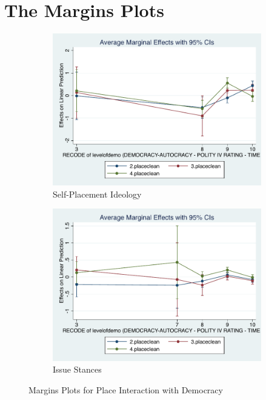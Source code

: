 \documentclass[12pt, titlepage]{article}
\begin{document}
\section{The Margins Plots}

\begin{figure}[H]
	\centering
	\begin{subfigure}[b]{0.475\textwidth}   
		\centering 
		\includegraphics[width=\textwidth]{Margins/IdeoPlaceDem}
		\caption{Self-Placement Ideology}
	\end{subfigure}
	\hfill
	\begin{subfigure}[b]{0.475\textwidth}
		\centering 
		\includegraphics[width=\textwidth]{Margins/LibPlaceDem}
		\caption{Issue Stances}
	\end{subfigure}
	\caption{Margins Plots for Place Interaction with Democracy}
	\label{Democracy}
\end{figure}
\end{document}
